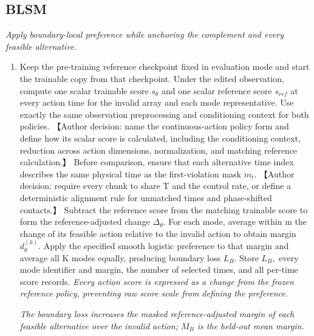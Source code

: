 \documentclass[10pt,a4paper]{article}
\begin{document}
\subsection*{BLSM}
\emph{Apply boundary-local preference while anchoring the complement and every feasible alternative.}
\begin{enumerate}[leftmargin=*,start=4]
  \item Keep the pre-training reference checkpoint fixed in evaluation mode and start the trainable copy from that checkpoint. Under the edited observation, compute one scalar trainable score \(s_\theta \) and one scalar reference score \(s_{ref}\) at every action time for the invalid array and each mode representative. Use exactly the same observation preprocessing and conditioning context for both policies. 【Author decision: name the continuous-action policy form and define how its scalar score is calculated, including the conditioning context, reduction across action dimensions, normalization, and matching reference calculation.】 Before comparison, ensure that each alternative time index describes the same physical time as the first-violation mask \(m_{t}.\) 【Author decision: require every chunk to share T and the control rate, or define a deterministic alignment rule for unmatched times and phase-shifted contacts.】 Subtract the reference score from the matching trainable score to form the reference-adjusted change \(\Delta _\theta .\) For each mode, average within m the change of its feasible action relative to the invalid action to obtain margin \(d_\theta ^(k).\) Apply the specified smooth logistic preference to that margin and average all K modes equally, producing boundary loss \(L_{B}.\) Store \(L_{B},\) every mode identifier and margin, the number of selected times, and all per-time score records.
\noindent\emph{Every action score is expressed as a change from the frozen reference policy, preventing raw score scale from defining the preference.}
\par{}
\noindent\emph{The boundary loss increases the masked reference-adjusted margin of each feasible alternative over the invalid action;\allowbreak{} \(M_{B}\) is the held-out mean margin.}
\par{}

\end{enumerate}
\end{document}
